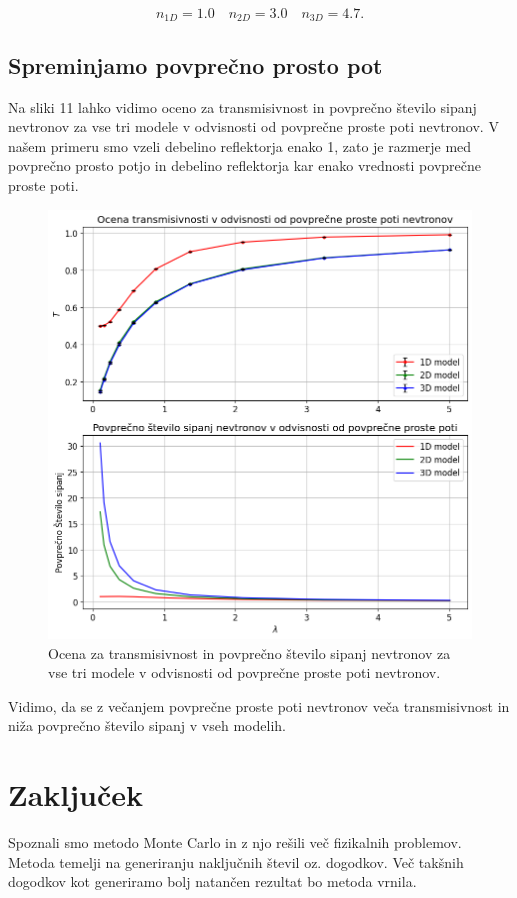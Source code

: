 \documentclass[slovene,11pt,a4paper]{article}
\begin{document}
\[
n_{1D} = 1.0 \quad
n_{2D} = 3.0 \quad
n_{3D} = 4.7.
\]

\subsection{Spreminjamo povprečno prosto pot}

Na sliki 11 lahko vidimo oceno za transmisivnost in povprečno število sipanj nevtronov za vse tri modele v odvisnosti od povprečne proste poti nevtronov. V našem primeru smo vzeli debelino reflektorja enako 1, zato je razmerje med povprečno prosto potjo in debelino reflektorja kar enako vrednosti povprečne proste poti.

\begin{figure}[h!]
\centering
\includegraphics[width=13cm]{nev3.png}
\caption{Ocena za transmisivnost in povprečno število sipanj nevtronov za vse tri modele v odvisnosti od povprečne proste poti nevtronov.}
\end{figure}
\noindent Vidimo, da se z večanjem povprečne proste poti nevtronov veča transmisivnost in niža povprečno število sipanj v vseh modelih.

\section{Zaključek}

Spoznali smo metodo Monte Carlo in z njo rešili več fizikalnih problemov. Metoda temelji na generiranju naključnih števil oz. dogodkov. Več takšnih dogodkov kot generiramo bolj natančen rezultat bo metoda vrnila.
\end{document}
